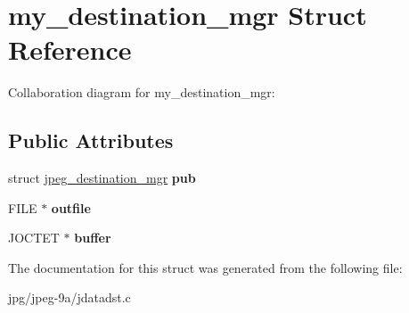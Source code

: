 \hypertarget{structmy__destination__mgr}{\section{my\+\_\+destination\+\_\+mgr Struct Reference}
\label{structmy__destination__mgr}
}


Collaboration diagram for my\+\_\+destination\+\_\+mgr\+:
\subsection*{Public Attributes}
\begin{DoxyCompactItemize}
\item 
\hypertarget{structmy__destination__mgr_a79800f27d02bb0446203ecf552034980}{struct \hyperlink{structjpeg__destination__mgr}{jpeg\+\_\+destination\+\_\+mgr} {\bfseries pub}}\label{structmy__destination__mgr_a79800f27d02bb0446203ecf552034980}

\item 
\hypertarget{structmy__destination__mgr_a759400870db2885a9c7cf49d8d3ce38e}{F\+I\+L\+E $\ast$ {\bfseries outfile}}\label{structmy__destination__mgr_a759400870db2885a9c7cf49d8d3ce38e}

\item 
\hypertarget{structmy__destination__mgr_aa93f525223299889fb3e491a7df3d412}{J\+O\+C\+T\+E\+T $\ast$ {\bfseries buffer}}\label{structmy__destination__mgr_aa93f525223299889fb3e491a7df3d412}

\end{DoxyCompactItemize}


The documentation for this struct was generated from the following file\+:\begin{DoxyCompactItemize}
\item 
jpg/jpeg-\/9a/jdatadst.\+c\end{DoxyCompactItemize}
